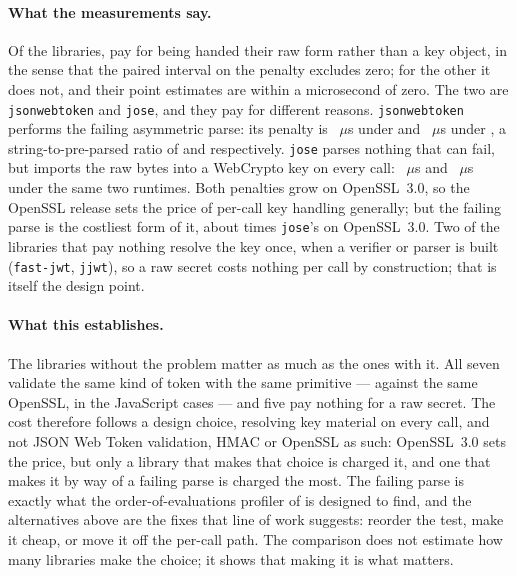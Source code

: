 \documentclass[pdflatex,sn-basic,twocolumn]{sn-jnl}%
\newcommand{\LibraryName}{\texttt{jsonwebtoken}}
\begin{document}
\paragraph{What the measurements say.} Of the \XlibLibCount{} libraries,
\XlibPenaltyLibCount{} pay for being handed their raw form rather than a key
object, in the sense that the paired interval on the penalty excludes zero; for
the other \XlibZeroPenaltyLibCount{} it does not, and their point estimates are
within a microsecond of zero. The two are \LibraryName{} and \texttt{jose}, and
they pay for different reasons. \LibraryName{} performs the failing asymmetric
parse: its penalty is \XlibJsonwebtokenOldSslPenalty~$\mu$s under
\XlibJsonwebtokenOldSslBackend{} and \XlibJsonwebtokenNewSslPenalty~$\mu$s under
\XlibJsonwebtokenNewSslBackend, a string-to-pre-parsed ratio of
\XlibJsonwebtokenOldSslRatio{} and \XlibJsonwebtokenNewSslRatio{}
respectively. \texttt{jose} parses nothing that can fail, but imports the raw
bytes into a WebCrypto key on every call: \XlibJoseOldSslPenalty~$\mu$s and
\XlibJoseNewSslPenalty~$\mu$s under the same two runtimes. Both penalties grow
on OpenSSL~3.0, so the OpenSSL release sets the price of per-call key handling
generally; but the failing parse is the costliest form of it, about
\XlibJwtOverJoseOldSsl{} times \texttt{jose}'s on OpenSSL~3.0. Two of the
libraries that pay nothing resolve the key once, when a verifier or parser is
built (\texttt{fast-jwt}, \texttt{jjwt}), so a raw secret costs nothing per
call by construction; that is itself the design point.

\paragraph{What this establishes.} The libraries without the problem matter as
much as the ones with it. All seven validate the same kind of token with the
same primitive --- against the same OpenSSL, in the JavaScript cases --- and
five pay nothing for a raw secret. The cost therefore follows a design choice,
resolving key material on every call, and not JSON Web Token validation, HMAC
or OpenSSL as such: OpenSSL~3.0 sets the price, but only a library that makes
that choice is charged it, and one that makes it by way of a failing parse is
charged the most. The failing parse is exactly what the order-of-evaluations
profiler of \citet{selakovic2017actionable} is designed to
find, and the alternatives above are the fixes that line of work suggests:
reorder the test, make it cheap, or move it off the per-call path. The
comparison does not estimate how many libraries make the choice; it shows that
making it is what matters.
\end{document}
